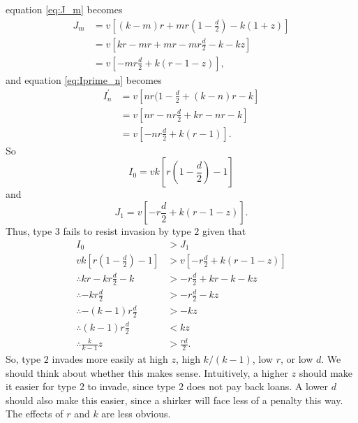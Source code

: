 \documentclass[14pt, a4paper, justified]{article}
\begin{document}
equation \ref{eq:J_m} becomes
\begin{equation}
    \begin{split}
        J_m & = v[(k-m)r + mr(1 - \frac{d}{2}) - k(1+z)] \\
        & = v[kr - mr + mr - mr\frac{d}{2} - k - kz] \\
        & = v[- mr\frac{d}{2} + k(r - 1 - z)],
    \end{split}
\end{equation}
and equation \ref{eq:Iprime_n} becomes
\begin{equation}
    \begin{split}
        I^\prime_n & = v [nr(1-\frac{d}{2} + (k-n)r - k]\\
        & = v[nr - nr\frac{d}{2} + kr - nr - k]\\
        & = v[-nr\frac{d}{2} + k(r - 1)].
    \end{split}
\end{equation}
So
\begin{equation}
    I_0 = vk[r(1-\frac{d}{2}) - 1]
\end{equation}
and
\begin{equation}
    J_1 = v[-r\frac{d}{2} + k(r-1-z)].
\end{equation}
Thus, type $3$ fails to resist invasion by type $2$ given that
\begin{equation}
    \begin{split}
        I_0 & > J_1 \\
        vk[r(1-\frac{d}{2}) - 1] & > v[-r\frac{d}{2} + k(r-1-z)] \\
        \therefore kr - kr\frac{d}{2} - k & > -r\frac{d}{2} + kr - k - kz \\
        \therefore -kr\frac{d}{2} & > -r\frac{d}{2} - kz \\
        \therefore -(k-1)r\frac{d}{2} & > -kz \\
        \therefore (k-1)r\frac{d}{2} & < kz \\
        \therefore \frac{k}{k-1}z & > \frac{rd}{2}.
    \end{split}
    \label{eq:2_invade_3}
\end{equation}
So, type $2$ invades more easily at high $z$, high $k/(k-1)$, low $r$, or low $d$.
We should think about whether this makes sense.
Intuitively, a higher $z$ should make it easier for type $2$ to invade, since type $2$ does not pay back loans.
A lower $d$ should also make this easier, since a shirker will face less of a penalty this way.
The effects of $r$ and $k$ are less obvious.
\end{document}

